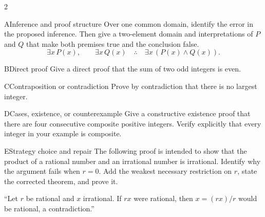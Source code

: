 \documentclass[9pt]{extarticle}
\begin{document}
\begin{multicols}{2}
\begin{CoreProblem}{A}{Inference and proof structure}
Over one common domain, identify the error in the proposed inference. Then give
a two-element domain and interpretations of $P$ and $Q$ that make both premises
true and the conclusion false.
\[
\exists x\,P(x),\qquad \exists x\,Q(x)
\quad\therefore\quad
\exists x\,(P(x)\land Q(x)).
\]
\end{CoreProblem}
\begin{CoreProblem}{B}{Direct proof}
Give a direct proof that the sum of two odd integers is even.
\end{CoreProblem}
\begin{CoreProblem}{C}{Contraposition or contradiction}
Prove by contradiction that there is no largest integer.
\end{CoreProblem}
\columnbreak
\begin{CoreProblem}{D}{Cases, existence, or counterexample}
Give a constructive existence proof that there are four consecutive composite
positive integers. Verify explicitly that every integer in your example is
composite.
\end{CoreProblem}
\begin{CoreProblem}{E}{Strategy choice and repair}
The following proof is intended to show that the product of a rational number
and an irrational number is irrational. Identify why the argument fails when
$r=0$. Add the weakest necessary restriction on $r$, state the corrected
theorem, and prove it.

``Let $r$ be rational and $x$ irrational. If $rx$ were rational, then $x=(rx)/r$ would be rational, a contradiction.''
\end{CoreProblem}
\end{multicols}
\CoreWorkArea
\FormBreak
{}
\end{document}
